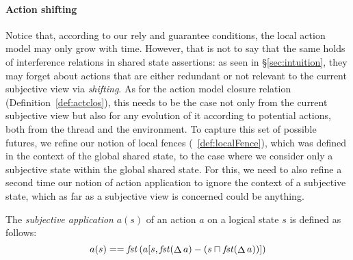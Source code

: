 \paragraph{Action shifting}
Notice that, according to our rely and guarantee conditions, the local
action model may only grow with time. However, that is not to say that
the same holds of interference relations in shared state assertions:
as seen in \S\ref{sec:intuition}, they may forget about actions that
are either redundant or not relevant to the current subjective
view via \emph{shifting}. As for the action model closure relation
(Definition~\ref{def:actclos}), this needs to be the case not only
from the current subjective view but also for any evolution of it
according to potential actions, both from the thread and the
environment. To capture this set of possible futures, we refine our
notion of local fences (~\ref{def:localFence}), which was
defined in the context of the global shared state, to the case where
we consider only a subjective state within the global shared state.
For this, we need to also refine a second time our notion of action
application to ignore the context of a subjective state, which as far
as a subjective view is concerned could be anything.


\begin{definition}
  The \emph{subjective application} $a(s)$ of an action $a$ on a
  logical state $s$ is defined as follows:
  \[
  a(s) == \mathit{fst} \left( a[s, \mathit{fst}(\mathop{\Delta} a) - (s\sqcap_{} \mathit{fst}(\mathop{\Delta} a))] \right)
  \]
\end{definition}

